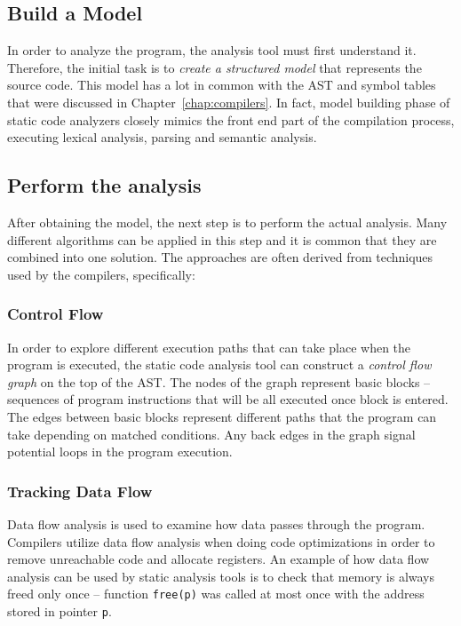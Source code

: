 \documentclass[
  digital, %
  table,   %
  lof,     %
  lot,     %
  oneside,
]{fithesis3}
\begin{document}
\subsection{Build a Model}
In order to analyze the program, the analysis tool must first understand it. Therefore, the initial task is to \textit{create a structured model} that represents the source code. This model has a lot in common with the AST and symbol tables that were discussed in Chapter~\ref{chap:compilers}. In fact, model building phase of static code analyzers closely mimics the front end part of the compilation process, executing lexical analysis, parsing and semantic analysis.

\subsection{Perform the analysis}
After obtaining the model, the next step is to perform the actual analysis. Many different algorithms can be applied in this step and it is common that they are combined into one solution. The approaches are often derived from techniques used by the compilers, specifically:

\subsubsection{Control Flow}
In order to explore different execution paths that can take place when the program is executed, the static code analysis tool can construct a \textit{control flow graph} on the top of the AST. The nodes of the graph represent basic blocks -- sequences of program instructions that will be all executed once block is entered. The edges between basic blocks represent different paths that the program can take depending on matched conditions. Any back edges in the graph signal potential loops in the program execution.

\subsubsection{Tracking Data Flow}
Data flow analysis is used to examine how data passes through the program. Compilers utilize data flow analysis when doing code optimizations in order to remove unreachable code and allocate registers. An example of how data flow analysis can be used by static analysis tools is to check that memory is always freed only once -- function \texttt{free(p)} was called at most once with the address stored in pointer \texttt{p}.
\end{document}
